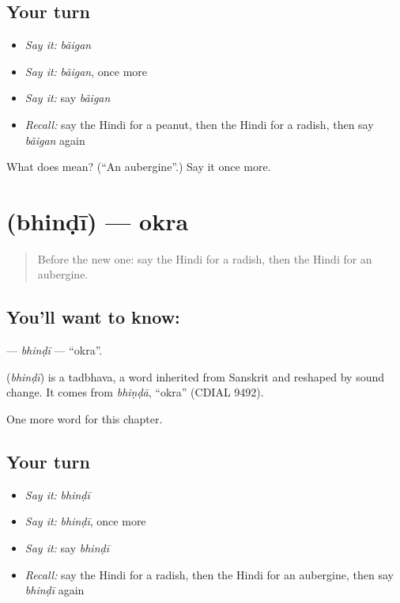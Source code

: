 \subsection*{Your turn}
\begin{itemize}
\raggedright
  \item \emph{Say it:} \emph{bãigan}
  \item \emph{Say it:} \emph{bãigan}, once more
  \item \emph{Say it:} say \emph{bãigan}
  \item \emph{Recall:} say the Hindi for a peanut, then the Hindi for a radish, then say \emph{bãigan} again
\end{itemize}

\begin{tcolorbox}[breakable,colback=teal!4,colframe=teal!35!black,title={Before you move on}]
What does  mean? (\textquotedblleft{}An aubergine\textquotedblright{}.) Say it once more.
\end{tcolorbox}
\section[\texorpdfstring{\hi{भिंडी} (bhinḍī)}{भिंडी (bhinḍī)}]{ (bhinḍī) — okra}

\label{lesson:HI-C216-bhindi}



\begin{quote}
Before the new one: say the Hindi for a radish, then the Hindi for an aubergine.
\end{quote}

\subsection*{You'll want to know: }
\textbf{} — \emph{bhinḍī} — \textquotedblleft{}okra\textquotedblright{}.

\begin{cousinweb}
\textbf{} (\emph{bhinḍī}) is a tadbhava, a word inherited from Sanskrit and reshaped by sound change. It comes from \emph{bhiṇḍā}, \textquotedblleft{}okra\textquotedblright{} (CDIAL 9492).
\end{cousinweb}

\begin{grammarlens}[title={What you've built}]
One more word for this chapter.
\end{grammarlens}

\subsection*{Your turn}
\begin{itemize}
\raggedright
  \item \emph{Say it:} \emph{bhinḍī}
  \item \emph{Say it:} \emph{bhinḍī}, once more
  \item \emph{Say it:} say \emph{bhinḍī}
  \item \emph{Recall:} say the Hindi for a radish, then the Hindi for an aubergine, then say \emph{bhinḍī} again
\end{itemize}

